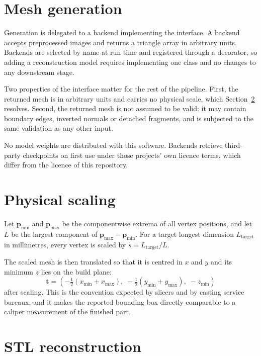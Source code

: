 \documentclass[11pt, a4paper]{article}
\begin{document}
\section{Mesh generation}

Generation is delegated to a backend implementing the 
interface. A backend accepts preprocessed images and returns a triangle array
in arbitrary units. Backends are selected by name at run time and registered
through a decorator, so adding a reconstruction model requires implementing one
class and no changes to any downstream stage.

Two properties of the interface matter for the rest of the pipeline. First, the
returned mesh is in arbitrary units and carries no physical scale, which
Section~\ref{sec:scaling} resolves. Second, the returned mesh is not assumed to
be valid: it may contain boundary edges, inverted normals or detached
fragments, and is subjected to the same validation as any other input.

No model weights are distributed with this software. Backends retrieve
third-party checkpoints on first use under those projects' own licence terms,
which differ from the licence of this repository.

\section{Physical scaling}
\label{sec:scaling}

Let $\mathbf{p}_{\min}$ and $\mathbf{p}_{\max}$ be the componentwise extrema of
all vertex positions, and let $L$ be the largest component of
$\mathbf{p}_{\max} - \mathbf{p}_{\min}$. For a target longest dimension
$L_{\mathrm{target}}$ in millimetres, every vertex is scaled by
$s = L_{\mathrm{target}} / L$.

The scaled mesh is then translated so that it is centred in $x$ and $y$ and its
minimum $z$ lies on the build plane:
%
\begin{equation}
  \mathbf{t} =
  \left(
    -\tfrac{1}{2}\left(x_{\min} + x_{\max}\right),\;
    -\tfrac{1}{2}\left(y_{\min} + y_{\max}\right),\;
    -z_{\min}
  \right)
\end{equation}
%
after scaling. This is the convention expected by slicers and by casting
service bureaux, and it makes the reported bounding box directly comparable to
a caliper measurement of the finished part.

\section{STL reconstruction}
\end{document}
